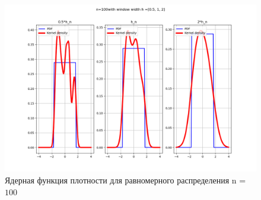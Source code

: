 \documentclass[a4]{article}
\begin{document}
\begin{center}
	\begin{figure}[H]
		\caption{ Ядерная функция плотности для равномерного распределения n = $100$}
		\includegraphics[width=\textwidth]{Lab4_uniform_pdf_100.png} 
	\end{figure}
	
\end{center}
\end{document}

